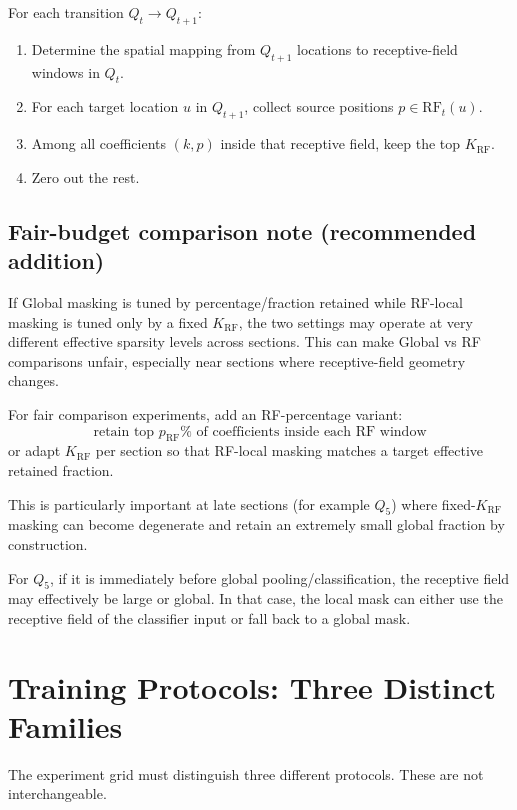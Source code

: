 \documentclass[11pt]{article}
\begin{document}
For each transition \(Q_t \rightarrow Q_{t+1}\):

\begin{enumerate}[leftmargin=*]
    \item Determine the spatial mapping from \(Q_{t+1}\) locations to receptive-field windows in \(Q_t\).
    \item For each target location \(u\) in \(Q_{t+1}\), collect source positions \(p \in \mathrm{RF}_t(u)\).
    \item Among all coefficients \((k,p)\) inside that receptive field, keep the top \(K_{\mathrm{RF}}\).
    \item Zero out the rest.
\end{enumerate}

\subsection{Fair-budget comparison note (recommended addition)}

If Global masking is tuned by percentage/fraction retained while RF-local masking is tuned only by a fixed \(K_{\mathrm{RF}}\), the two settings may operate at very different effective sparsity levels across sections. This can make Global vs RF comparisons unfair, especially near sections where receptive-field geometry changes.

For fair comparison experiments, add an RF-percentage variant:
\[
\text{retain top } p_{\mathrm{RF}}\% \text{ of coefficients inside each RF window}
\]
or adapt \(K_{\mathrm{RF}}\) per section so that RF-local masking matches a target effective retained fraction.

This is particularly important at late sections (for example \(Q_5\)) where fixed-\(K_{\mathrm{RF}}\) masking can become degenerate and retain an extremely small global fraction by construction.

For \(Q_5\), if it is immediately before global pooling/classification, the receptive field may effectively be large or global. In that case, the local mask can either use the receptive field of the classifier input or fall back to a global mask.


\section{Training Protocols: Three Distinct Families}

The experiment grid must distinguish three different protocols. These are not interchangeable.
\end{document}
